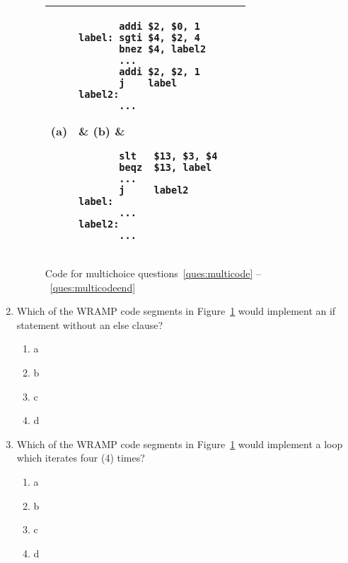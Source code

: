\documentclass[a4paper,10pt]{article}
\begin{document}
\begin{enumerate}
\begin{figure}[h]
\begin{footnotesize}
\begin{center}
\begin{tabular}{|lp{4cm}|lp{4cm}|}
\hline
(a) &
\begin{verbatim}
       addi $2, $0, 1
label: sgti $4, $2, 4
       bnez $4, label2
       ...
       addi $2, $2, 1
       j    label
label2:
       ...
\end{verbatim}
& (b) &
\begin{verbatim}
       slt   $13, $3, $4
       beqz  $13, label
       ...
       j     label2
label:
       ...
label2:
       ...
\end{verbatim}
\\
\hline
(c) &
\begin{verbatim}
       sge   $13, $3, $4
       beqz  $13, label
       ...
label: 
       ...
\end{verbatim}
& (d) &
\begin{verbatim}
       addi $2, $0, 1
label: sgei $4, $2, 4
       bnez $4, label2
       ...
       addi $2, $2, 1
       j    label
label2:
       ...     
\end{verbatim}
\\
\hline
\end{tabular}
\end{center}
\end{footnotesize}
\caption{Code for multichoice questions~\ref{ques:multicode}
--~\ref{ques:multicodeend}}
\label{fig:multicode}
\end{figure}

\item 
\label{ques:multicode}
Which of the WRAMP code segments in Figure~\ref{fig:multicode}
would implement an if statement without an else clause?
\begin{enumerate}
  \item a
  \item b
  \item c
  \item d
\end{enumerate}

\item 
Which of the WRAMP code segments in Figure~\ref{fig:multicode} would
implement a loop which iterates four (4) times?
\begin{enumerate}
  \item a
  \item b
  \item c
  \item d
\end{enumerate}


\end{enumerate}
\end{document}
